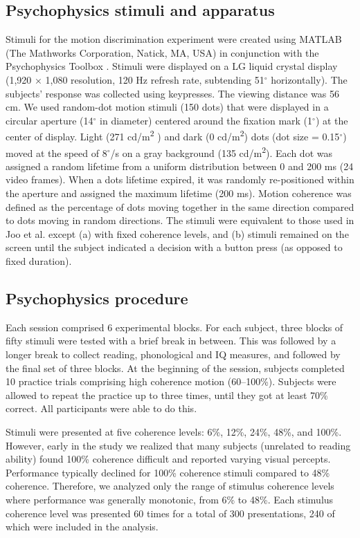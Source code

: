\documentclass[../uwthesis.tex]{subfiles}
\begin{document}
\subsection{Psychophysics stimuli and apparatus}
Stimuli for the motion discrimination experiment were created using MATLAB (The Mathworks Corporation, Natick, MA, USA) in conjunction with the Psychophysics Toolbox \cite{Brainard1997TheToolbox}. Stimuli were displayed on a LG liquid crystal display (1,920 $\times$ 1,080 resolution, 120 Hz refresh rate, subtending 51$^\circ$ horizontally). The subjects’ response was collected using keypresses. The
viewing distance was 56 cm. We used random-dot motion stimuli (150 dots) that were displayed
in a circular aperture (14$^\circ$ in diameter) centered around the fixation mark (1$^\circ$) at the center of
display. Light (271 cd/m\textsuperscript{2} ) and dark (0 cd/m\textsuperscript{2}) dots (dot size = 0.15$^\circ$) moved at the speed of 8$^\circ$/s on a gray background (135 cd/m\textsuperscript{2}). Each dot was assigned a random lifetime from a uniform distribution between 0 and 200 ms (24 video frames). When a dots lifetime expired, it was randomly re-positioned within the aperture and assigned the maximum lifetime (200 ms). Motion coherence was defined as the percentage of dots moving together in the same direction compared
to dots moving in random directions. The stimuli were equivalent to those used in Joo et al. \cite{Joo2017TheReconsidered}
except (a) with fixed coherence levels, and (b) stimuli remained on the screen until the subject indicated a decision with a button press (as opposed to fixed duration).

\subsection{Psychophysics procedure}
Each session comprised 6 experimental blocks. For each subject, three blocks of fifty
stimuli were tested with a brief break in between. This was followed by a longer break to collect
reading, phonological and IQ measures, and followed by the final set of three blocks. At the
beginning of the session, subjects completed 10 practice trials comprising high coherence motion (60–100\%). Subjects were allowed to repeat the practice up to three times, until they got at least 70\% correct. All participants were able to do this.

Stimuli were presented at five coherence levels: 6\%, 12\%, 24\%, 48\%, and 100\%. However, early in the study we realized that many subjects (unrelated to reading ability) found 100\%
coherence difficult and reported varying visual percepts. Performance typically declined for 100\% coherence stimuli compared to 48\% coherence. Therefore, we analyzed only the range of stimulus coherence levels where performance was generally monotonic, from 6\% to 48\%. Each stimulus
coherence level was presented 60 times for a total of 300 presentations, 240 of which were included
in the analysis.
\end{document}
